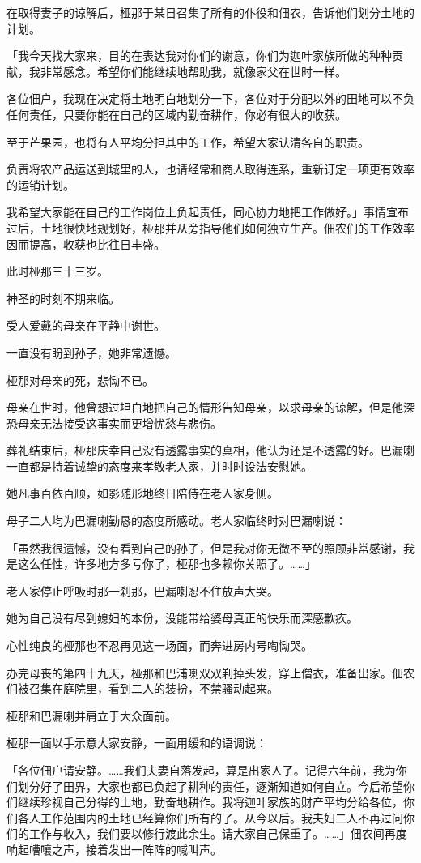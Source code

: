 \documentclass[twoside,openany]{book}
\begin{document}
在取得妻子的谅解后，桠那于某日召集了所有的仆役和佃农，告诉他们划分土地的计划。

「我今天找大家来，目的在表达我对你们的谢意，你们为迦叶家族所做的种种贡献，我非常感念。希望你们能继续地帮助我，就像家父在世时一样。

各位佃户，我现在决定将土地明白地划分一下，各位对于分配以外的田地可以不负任何责任，只要你能在自己的区域内勤奋耕作，你必有很大的收获。

至于芒果园，也将有人平均分担其中的工作，希望大家认清各自的职责。

负责将农产品运送到城里的人，也请经常和商人取得连系，重新订定一项更有效率的运销计划。

我希望大家能在自己的工作岗位上负起责任，同心协力地把工作做好。」事情宣布过后，土地很快地规划好，桠那并从旁指导他们如何独立生产。佃农们的工作效率因而提高，收获也比往日丰盛。

此时桠那三十三岁。



神圣的时刻不期来临。

受人爱戴的母亲在平静中谢世。

一直没有盼到孙子，她非常遗憾。

桠那对母亲的死，悲恸不已。

母亲在世时，他曾想过坦白地把自己的情形告知母亲，以求母亲的谅解，但是他深恐母亲无法接受这事实而更增忧愁与悲伤。

葬礼结束后，桠那庆幸自己没有透露事实的真相，他认为还是不透露的好。巴漏喇一直都是持着诚挚的态度来孝敬老人家，并时时设法安慰她。

她凡事百依百顺，如影随形地终日陪侍在老人家身侧。

母子二人均为巴漏喇勤恳的态度所感动。老人家临终时对巴漏喇说：

「虽然我很遗憾，没有看到自己的孙子，但是我对你无微不至的照顾非常感谢，我是这么任性，许多地方多亏你了，桠那也多赖你关照了。……」

老人家停止呼吸时那一刹那，巴漏喇忍不住放声大哭。

她为自己没有尽到媳妇的本份，没能带给婆母真正的快乐而深感歉疚。

心性纯良的桠那也不忍再见这一场面，而奔进房内号啕恸哭。

办完母丧的第四十九天，桠那和巴浦喇双双剃掉头发，穿上僧衣，准备出家。佃农们被召集在庭院里，看到二人的装扮，不禁骚动起来。

桠那和巴漏喇并肩立于大众面前。

桠那一面以手示意大家安静，一面用缓和的语调说：

「各位佃户请安静。……我们夫妻自落发起，算是出家人了。记得六年前，我为你们划分好了田界，大家也都已负起了耕种的责任，逐渐知道如何自立。今后希望你们继续珍视自己分得的土地，勤奋地耕作。我将迦叶家族的财产平均分给各位，你们各人工作范围内的土地已经算你们所有的了。从今以后。我夫妇二人不再过问你们的工作与收入，我们要以修行渡此余生。请大家自己保重了。……」佃农间再度响起嘈嚷之声，接着发出一阵阵的喊叫声。
\end{document}
